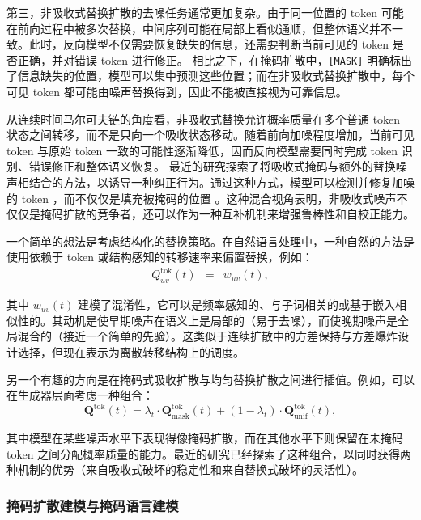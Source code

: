 \documentclass[UTF8,a4paper,zihao=-4,oneside,openany]{ctexbook}
\begin{document}
第三，非吸收式替换扩散的去噪任务通常更加复杂。由于同一位置的 token 可能在前向过程中被多次替换，中间序列可能在局部上看似通顺，但整体语义并不一致。此时，反向模型不仅需要恢复缺失的信息，还需要判断当前可见的 token 是否正确，并对错误 token 进行修正。
相比之下，在掩码扩散中，\texttt{[MASK]} 明确标出了信息缺失的位置，模型可以集中预测这些位置；而在非吸收式替换扩散中，每个可见 token 都可能由噪声替换得到，因此不能被直接视为可靠信息。

从连续时间马尔可夫链的角度看，非吸收式替换允许概率质量在多个普通 token 状态之间转移，而不是只向一个吸收状态移动。随着前向加噪程度增加，当前可见 token 与原始 token 一致的可能性逐渐降低，因而反向模型需要同时完成 token 识别、错误修正和整体语义恢复。
最近的研究探索了将吸收式掩码与额外的替换噪声相结合的方法，以诱导一种纠正行为。通过这种方式，模型可以检测并修复加噪的 token ，而不仅仅是填充被掩码的位置 \citep{zhang-etal:2025corrective,rutte-etal:2025generalized}。这种混合视角表明，非吸收式噪声不仅仅是掩码扩散的竞争者，还可以作为一种互补机制来增强鲁棒性和自校正能力。

一个简单的想法是考虑结构化的替换策略。在自然语言处理中，一种自然的方法是使用依赖于 token 或结构感知的转移速率来偏置替换，例如：
\begin{eqnarray}
Q^{\mathrm{tok}}_{uv}(t) & = & w_{uv}(t),
\end{eqnarray}

\noindent 其中 $w_{uv}(t)$ 建模了混淆性，它可以是频率感知的、与子词相关的或基于嵌入相似性的。其动机是使早期噪声在语义上是局部的（易于去噪），而使晚期噪声是全局混合的（接近一个简单的先验）。这类似于连续扩散中的方差保持与方差爆炸设计选择，但现在表示为离散转移结构上的调度。

另一个有趣的方向是在掩码式吸收扩散与均匀替换扩散之间进行插值。例如，可以在生成器层面考虑一种组合：
\begin{equation}
\mathbf{Q}^{\mathrm{tok}}(t) = \lambda_t \cdot \mathbf{Q}_{\text{mask}}^{\mathrm{tok}}(t) + (1-\lambda_t) \cdot \mathbf{Q}_{\text{unif}}^{\mathrm{tok}}(t),
\end{equation}

\noindent 其中模型在某些噪声水平下表现得像掩码扩散，而在其他水平下则保留在未掩码 token 之间分配概率质量的能力。最近的研究已经探索了这种组合，以同时获得两种机制的优势（来自吸收式破坏的稳定性和来自替换式破坏的灵活性）。
\subsubsection{掩码扩散建模与掩码语言建模}
\end{document}
